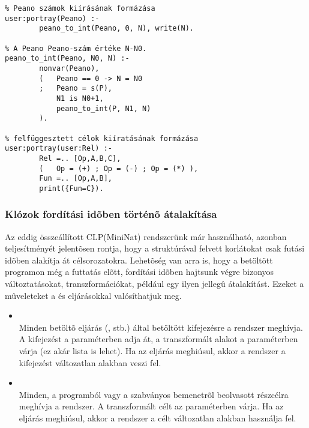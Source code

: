 \begin{verbatim}
% Peano számok kiírásának formázása
user:portray(Peano) :-
        peano_to_int(Peano, 0, N), write(N).

% A Peano Peano-szám értéke N-N0.
peano_to_int(Peano, N0, N) :-
        nonvar(Peano),
        (   Peano == 0 -> N = N0
        ;   Peano = s(P), 
            N1 is N0+1,
            peano_to_int(P, N1, N)
        ).

% felfüggesztett célok kiíratásának formázása
user:portray(user:Rel) :-
        Rel =.. [Op,A,B,C],
        (   Op = (+) ; Op = (-) ; Op = (*) ),
        Fun =.. [Op,A,B],
        print({Fun=C}).
\end{verbatim}

\subsubsection{Klózok fordítási idõben történõ átalakítása}

Az eddig összeállított CLP(MiniNat) rendszerünk már használható, azonban
teljesítményét jelentõsen rontja, hogy a  struktúrával felvett
korlátokat csak futási idõben alakítja át célsorozatokra. Lehetõség van
arra is, hogy a betöltött programon még a futtatás elõtt, fordítási idõben
hajtsunk végre bizonyos változtatásokat, transzformációkat, például egy
ilyen jellegû átalakítást. Ezeket a mûveleteket a  és
 eljárásokkal valósíthatjuk meg.

\begin{itemize}
\item {} \\
      Minden betöltõ eljárás (,  stb.) által
      betöltött kifejezésre a rendszer meghívja. A kifejezést a 
      paraméterben adja át, a transzformált alakot a  paraméterben
      várja (ez akár lista is lehet). Ha az eljárás meghiúsul, akkor a rendszer
      a kifejezést változatlan alakban veszi fel.

\item {} \\
      Minden, a programból vagy a szabványos bemenetrõl beolvasott részcélra
      meghívja a rendszer. A transzformált célt az  paraméterben
      várja. Ha az eljárás meghiúsul, akkor a rendszer a célt változatlan
      alakban használja fel.
\end{itemize}

